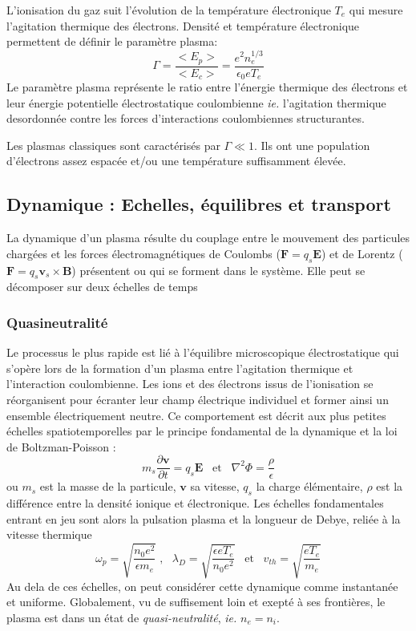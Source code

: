 			L'ionisation du gaz suit l'évolution de la température électronique $T_e$ qui
			mesure l'agitation thermique des électrons. Densité et température
			électronique permettent de définir le paramètre plasma:
				$$\Gamma=\frac{<E_p>}{<E_c>}=\frac{e^2n_e^{1/3}}{\epsilon_0 eT_e}$$
			Le paramètre plasma représente le ratio entre l'énergie thermique des
			électrons et leur énergie potentielle électrostatique coulombienne \emph{ie.}
			l'agitation thermique desordonnée contre les forces d'interactions
			coulombiennes structurantes. 
			
			Les plasmas classiques sont caractérisés par
			$\Gamma\ll 1$. Ils ont une population d'électrons assez espacée et/ou une
			température suffisamment élevée.
			
		\subsection{Dynamique : Echelles, équilibres et transport}
		La dynamique d'un plasma résulte du couplage entre le mouvement des
		particules chargées et les forces électromagnétiques de Coulombs ($\mathbf
		F=q_s\mathbf E$) et de Lorentz ($\mathbf F=q_s\mathbf v_s\times\mathbf B$)
		présentent ou qui se forment dans le système.
		Elle peut se décomposer sur deux échelles de temps 
			\subsubsection{Quasineutralité}
			Le processus le plus rapide est lié à
			l'équilibre microscopique électrostatique qui s'opère lors de la formation
			d'un plasma entre l'agitation thermique et l'interaction coulombienne. Les
			ions et des électrons issus de l'ionisation se réorganisent pour écranter
			leur champ électrique individuel et former ainsi un ensemble électriquement neutre. 
			Ce comportement est décrit aux plus petites échelles spatiotemporelles par
			le principe fondamental de la dynamique et la loi de Boltzman-Poisson :
			$$m_s\frac{\partial \mathbf{v}}{\partial t}=q_s\mathbf E
			\;\;\;\text{et}\;\;\;\nabla^2\Phi=\frac{\rho}{\epsilon}$$ ou
			$m_s$ est la masse de la particule, $\mathbf{v}$ sa vitesse, $q_s$ la
			charge élémentaire, $\rho$ est la différence entre la densité ionique et
			électronique.
			Les échelles fondamentales entrant en jeu sont alors la pulsation plasma et
			la longueur de Debye, reliée à la vitesse thermique 
			$$\omega_p=\sqrt{\frac{n_0e^2}{\epsilon
			m_e}}\;\text{,}\;\;\;\lambda_D=\sqrt{\frac{\epsilon
			eT_e}{n_0e^2}}\;\;\;\text{et}\;\;\;v_{th}=\sqrt{\frac{eT_e}{m_e}}$$
			Au dela de ces échelles, on peut considérer cette dynamique comme instantanée
			et uniforme. Globalement, vu de suffisement loin et exepté à ses frontières,
			le plasma est dans un état de \emph{quasi-neutralité}, \emph{ie.} $n_e=n_i$.
			
